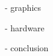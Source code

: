 \documentclass{article}
\begin{document}
- graphics

- hardware



- conclusion









\begin{thebibliography}{1}



\end{thebibliography}
\end{document}
